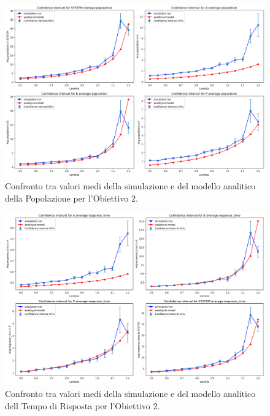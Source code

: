 \begin{figure}
    \centering
    \includegraphics[width=1\linewidth]{figs//results//obj2//verification/obj2_lineplots_population.png}
    \caption{Confronto tra valori medi della simulazione e del modello analitico della Popolazione per l'Obiettivo 2.}
    \label{fig:obj2_lineplots_population}
\end{figure}

\begin{figure}
    \centering
    \includegraphics[width=1\linewidth]{figs//results//obj2//verification/obj2_lineplots_rtime.png}
    \caption{Confronto tra valori medi della simulazione e del modello analitico dell Tempo di Risposta per l'Obiettivo 2.}
    \label{fig:obj2_lineplots_rtime}
\end{figure}

